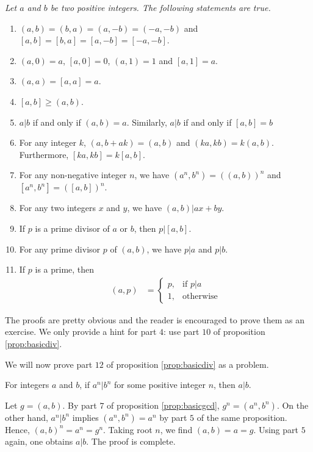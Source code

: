 \documentclass{subfile}
\begin{document}
	\begin{proposition}\slshape\label{prop:basicgcd}
		Let $a$ and $b$ be two positive integers. The following statements are true.
		\begin{enumerate}
			\item 	$(a, b) = (b, a) = (a, -b) = (-a, -b)$ and $[a, b]=[b, a] = [a, -b] = [-a, -b]$.
			\item 	$(a,0)=a$, $[a,0]=0$, $(a,1)=1$ and $[a,1]=a$.
			\item 	$(a,a)=[a,a] = a$.
			\item   $[a,b] \geq (a,b)$.
			\item	$a|b$ if and only if $(a,b)=a$. Similarly, $a|b$ if and only if $[a,b]=b$
			\item   For any integer $k$, $ (a, b+ak) = (a, b)$ and $(ka,kb)=k(a,b)$. Furthermore, $[ka,kb]=k[a,b]$.
			\item   For any non-negative integer $n$, we have $(a^n,b^n)=\left((a,b)\right)^n$ and $[a^n,b^n]=\left([a,b]\right)^n$.
			\item 	For any two integers $x$ and $y$, we have $(a,b)|ax+by$.
			\item 	If $p$ is a prime divisor of $a$ or $b$, then $p|[a,b]$.
			\item 	For any prime divisor $p$ of $(a, b)$, we have $p|a$ and $p|b$.
			\item 	If $p$ is a prime, then
			\begin{align*}
				(a,p) & =
				\begin{cases}
					p,& \text{if } p|a\\
					1,& \text{otherwise}
				\end{cases}
			\end{align*}
		\end{enumerate}
	\end{proposition}

	The proofs are pretty obvious and the reader is encouraged to prove them as an exercise. We only provide a hint for part $4$: use part $10$ of proposition \eqref{prop:basicdiv}.

	We will now prove part $12$ of proposition \eqref{prop:basicdiv} as a problem.

	\begin{problem}
		For integers $a$ and $b$, if $a^n | b^n$ for some positive integer $n$, then $a|b$.
	\end{problem}

	\begin{solution}
		Let $g=(a,b)$. By part $7$ of proposition \eqref{prop:basicgcd}, $g^n = (a^n,b^n)$. On the other hand, $a^n|b^n$ implies $(a^n, b^n)=a^n$ by part $5$ of the same proposition. Hence, $(a, b)^n=a^n=g^n$. Taking root $n$, we find $(a,b)=a=g$. Using part $5$ again, one obtains $a|b$. The proof is complete.

	\end{solution}
\end{document}
